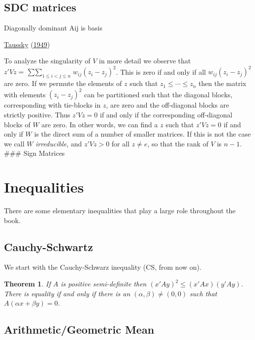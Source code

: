 \documentclass[
  12pt,
]{book}
\newtheorem{theorem}{Theorem}[chapter]
\theoremstyle{definition}
\theoremstyle{definition}
\theoremstyle{definition}
\theoremstyle{definition}
\theoremstyle{remark}
\begin{document}
\hypertarget{apsdc}{%
\subsection{SDC matrices}\label{apsdc}}

Diagonally dominant
Aij is basis

\protect\hyperlink{ref-taussky_49}{Taussky} (\protect\hyperlink{ref-taussky_49}{1949})

To analyze the singularity of \(V\) in more detail we observe that
\(z'Vz=\mathop{\sum\sum}_{1\leq i<j\leq n}w_{ij}(z_i-z_j)^2\). This is
zero if and only if all \(w_{ij}(z_i-z_j)^2\) are zero. If we permute the
elements of \(z\) such that \(z_1\leq\cdots\leq z_n\) then the matrix with
elements \((z_i-z_j)^2\) can be partitioned such that the diagonal blocks,
corresponding with tie-blocks in \(z\), are zero and the off-diagonal
blocks are strictly positive. Thus \(z'Vz=0\) if and only if the
corresponding off-diagonal blocks of \(W\) are zero. In other words, we
can find a \(z\) such that \(z'Vz=0\) if and only if \(W\) is the direct sum
of a number of smaller matrices. If this is not the case
we call \(W\) \emph{irreducible}, and \(z'Vz>0\) for all \(z\not= e\), so that the
rank of \(V\) is \(n-1\). \#\#\# Sign Matrices

\hypertarget{apineq}{%
\section{Inequalities}\label{apineq}}

There are some elementary inequalities that play a large role throughout the book.

\hypertarget{apcs}{%
\subsection{Cauchy-Schwartz}\label{apcs}}

We start with the Cauchy-Schwarz inequality (CS, from now on).

\begin{theorem}
\protect\hypertarget{thm:mathaddcs}{}{\label{thm:mathaddcs} }If \(A\) is positive semi-definite then \((x'Ay)^2\leq (x'Ax)(y'Ay)\). There is equality if and only if there is an \((\alpha,\beta)\not=(0,0)\) such that \(A(\alpha x+\beta y)=0\).
\end{theorem}

\hypertarget{apamgm}{%
\subsection{Arithmetic/Geometric Mean}\label{apamgm}}
\end{document}
